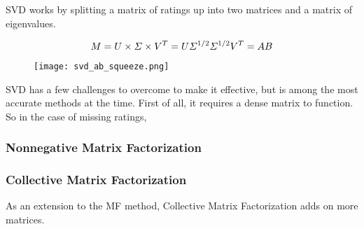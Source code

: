 SVD works by splitting a matrix of ratings up into two matrices and a matrix of eigenvalues.

\begin{equation} \label{eq:svd_AB_squeezing}
	\centering
	M = U\times \Sigma \times V^T = U\Sigma^{1/2} \Sigma^{1/2}V^T = AB
\end{equation}

\begin{figure}
	\centering
	\texttt{[image: svd\_ab\_squeeze.png]}
\end{figure}

SVD has a few challenges to overcome to make it effective, but is among the most accurate methods at the time. First of all, it requires a dense matrix to function. So in the case of missing ratings, 


\subsubsection{Nonnegative Matrix Factorization}


\subsubsection{Collective Matrix Factorization}
As an extension to the MF method, Collective Matrix Factorization adds on more matrices.
